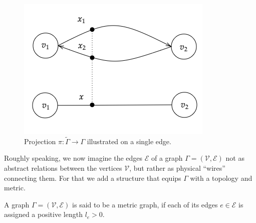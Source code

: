 \begin{figure}[H]
    \begin{center}
        \includegraphics[scale=0.8]{img/diagram-20220201_2.png}
    \end{center}
    \caption{Projection $\pi \colon \widetilde{\Gamma} \to \Gamma$ illustrated on a single edge.}
    \label{fig3}
\end{figure}

Roughly speaking, we now imagine the edges $\mathcal{E}$ of a graph $\Gamma = (\mathcal{V}, \mathcal{E})$ not as abstract relations between the vertices $\mathcal{V}$, but rather as physical “wires” connecting them. For that we add a structure that equips $\Gamma$ with a topology and metric. 

\begin{definition}\label{metric graph}
    A graph $\Gamma = (\mathcal{V}, \mathcal{E})$ is said to be a metric graph, if each of its edges $e \in \mathcal{E}$ is assigned a positive length $l_e > 0$.
\end{definition}


